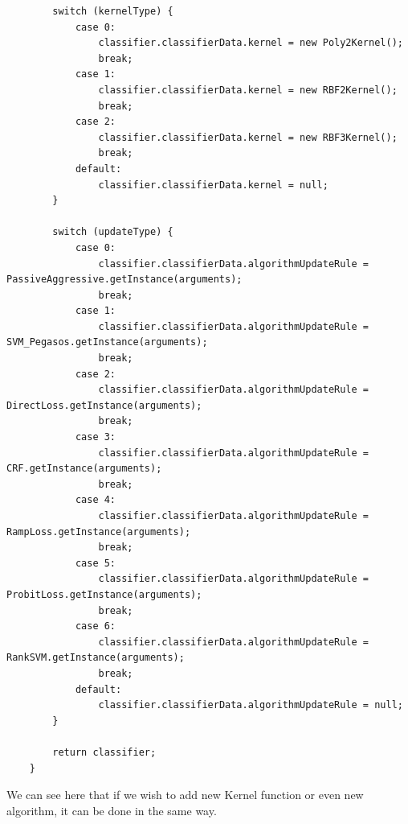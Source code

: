 \documentclass[11pt, oneside]{article}   	%
\begin{document}
\begin{lstlisting}
        switch (kernelType) {
            case 0:
                classifier.classifierData.kernel = new Poly2Kernel();
                break;
            case 1:
                classifier.classifierData.kernel = new RBF2Kernel();
                break;
            case 2:
                classifier.classifierData.kernel = new RBF3Kernel();
                break;
            default:
                classifier.classifierData.kernel = null;
        }
		
		switch (updateType) {
			case 0:
                classifier.classifierData.algorithmUpdateRule = PassiveAggressive.getInstance(arguments);
				break;
			case 1:
                classifier.classifierData.algorithmUpdateRule = SVM_Pegasos.getInstance(arguments);
				break;
			case 2:
                classifier.classifierData.algorithmUpdateRule = DirectLoss.getInstance(arguments);
				break;
			case 3:
                classifier.classifierData.algorithmUpdateRule = CRF.getInstance(arguments);
				break;
			case 4:
                classifier.classifierData.algorithmUpdateRule = RampLoss.getInstance(arguments);
				break;
			case 5:
                classifier.classifierData.algorithmUpdateRule = ProbitLoss.getInstance(arguments);
				break;
            case 6:
                classifier.classifierData.algorithmUpdateRule = RankSVM.getInstance(arguments);
                break;
			default:
				classifier.classifierData.algorithmUpdateRule = null;
		}

		return classifier;
	}
\end{lstlisting}

We can see here that if we wish to add new Kernel function or even new algorithm, it can be done in the same way.
\end{document}
